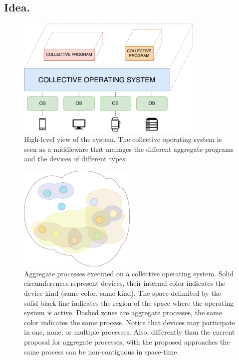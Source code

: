 \documentclass[12pt, a4paper]{article}
\begin{document}
\subsection{Idea.}
\label{subsec:idea.}

\begin{figure}
    \centering
    \includegraphics[width=0.8\textwidth]{figures/system}
    \caption{
        High-level view of the system.
        The collective operating system is seen as a middleware that manages the different aggregate programs and the devices
        of different types.
    }\label{fig:system}
\end{figure}

\begin{figure}
    \centering
    \includegraphics[width=0.5\textwidth]{figures/processes}
    \caption{
        Aggregate processes executed on a collective operating system.
        Solid circumferences represent devices, their internal color indicates the device kind
        (same color, same kind).
        The space delimited by the solid black line indicates the region of the space where the
        operating system is active.
        Dashed zones are aggregate processes,
        the same color indicates the same process.
        Notice that devices may participate in one, none, or multiple processes.
        Also, differently than the current proposal for aggregate processes,
        with the proposed approaches the same process can be non-contiguous in space-time.
    }\label{fig:processes}
\end{figure}
\end{document}
